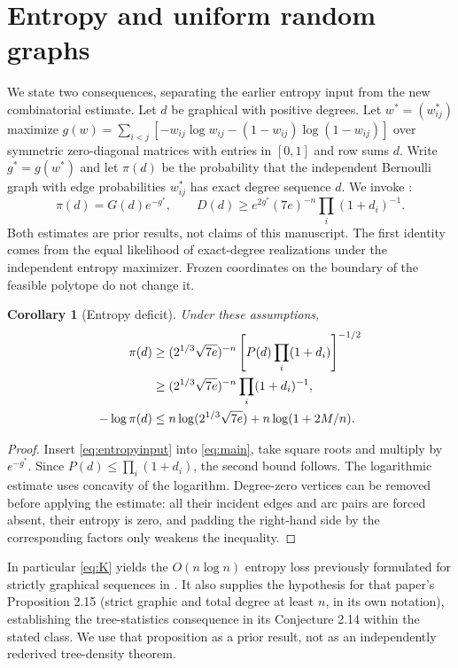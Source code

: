 \documentclass[11pt]{article}
\newtheorem{corollary}[theorem]{Corollary}
\theoremstyle{remark}\newtheorem{remark}[theorem]{Remark}
\begin{document}
\section{Entropy and uniform random graphs}\label{sec:entropy}
We state two consequences, separating the earlier entropy input from the new combinatorial estimate. Let $d$ be graphical with positive degrees. Let $w^*=(w_{ij}^*)$ maximize $g(w)=\sum_{i<j}[-w_{ij}\log w_{ij}-(1-w_{ij})\log(1-w_{ij})]$ over symmetric zero-diagonal matrices with entries in $[0,1]$ and row sums $d$. Write $g^*=g(w^*)$ and let $\pi(d)$ be the probability that the independent Bernoulli graph with edge probabilities $w_{ij}^*$ has exact degree sequence $d$. We invoke \cite[Theorems 4.2 and 6.1]{mehrdad26}:
\begin{equation}\label{eq:entropyinput}
 \pi(d)=G(d)e^{-g^*},\qquad
 D(d)\ge e^{2g^*}(7e)^{-n}\prod_i(1+d_i)^{-1}.
\end{equation}
Both estimates are prior results, not claims of this manuscript. The first identity comes from the equal likelihood of exact-degree realizations under the independent entropy maximizer. Frozen coordinates on the boundary of the feasible polytope do not change it.
\begin{corollary}[Entropy deficit]\label{cor:entropy}
Under these assumptions,
\begin{align}
 \pi(d)&\ge (2^{1/3}\sqrt{7e})^{-n}\left[P(d)\prod_i(1+d_i)\right]^{-1/2}\notag\\
 &\ge (2^{1/3}\sqrt{7e})^{-n}\prod_i(1+d_i)^{-1},\label{eq:pi}\\
 -\log\pi(d)&\le n\log(2^{1/3}\sqrt{7e})+n\log(1+2M/n).\label{eq:K}
\end{align}
\end{corollary}
\begin{proof}
Insert \eqref{eq:entropyinput} into \eqref{eq:main}, take square roots and multiply by $e^{-g^*}$. Since $P(d)\le\prod_i(1+d_i)$, the second bound follows. The logarithmic estimate uses concavity of the logarithm. Degree-zero vertices can be removed before applying the estimate: all their incident edges and arc pairs are forced absent, their entropy is zero, and padding the right-hand side by the corresponding factors only weakens the inequality.
\end{proof}
In particular \eqref{eq:K} yields the $O(n\log n)$ entropy loss previously formulated for strictly graphical sequences in \cite[Conjecture 2.13, version 4]{mehrdad14}. It also supplies the hypothesis for that paper's Proposition 2.15 (strict graphic and total degree at least $n$, in its own notation), establishing the tree-statistics consequence in its Conjecture 2.14 within the stated class. We use that proposition as a prior result, not as an independently rederived tree-density theorem.
\end{document}
